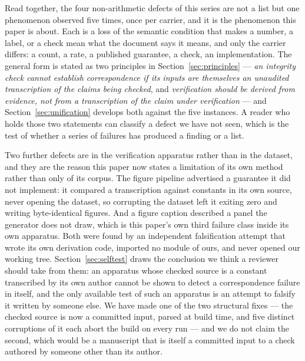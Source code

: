 \documentclass[sigconf,review]{acmart}
\begin{document}
Read together, the four non-arithmetic defects of this series are not a list
but one phenomenon observed five times, once per carrier, and it is the
phenomenon this paper is about. Each is a loss of the semantic condition that makes a number, a
label, or a check mean what the document says it means, and only the carrier
differs: a count, a rate, a published guarantee, a check, an implementation.
The general form is stated as two principles in Section~\ref{sec:principles} ---
\emph{an integrity check cannot establish correspondence if its inputs are
themselves an unaudited transcription of the claims being checked}, and
\emph{verification should be derived from evidence, not from a transcription of
the claim under verification} --- and Section~\ref{sec:unification} develops
both against the five instances. A reader who holds those two statements can
classify a defect we have not seen, which is the test of whether a series of
failures has produced a finding or a list.

Two further defects are in the verification apparatus rather than in the
dataset, and they are the reason this paper now states a limitation of its own
method rather than only of its corpus. The figure pipeline advertised a
guarantee it did not implement: it compared a transcription against constants
in its own source, never opening the dataset, so corrupting the dataset left it
exiting zero and writing byte-identical figures. And a figure caption described
a panel the generator does not draw, which is this paper's own third failure
class inside its own apparatus. Both were found by an independent falsification
attempt that wrote its own derivation code, imported no module of ours, and
never opened our working tree. Section~\ref{sec:selftest} draws the conclusion
we think a reviewer should take from them: an apparatus whose checked source is
a constant transcribed by its own author cannot be shown to detect a
correspondence failure in itself, and the only available test of such an
apparatus is an attempt to falsify it written by someone else. We have made one
of the two structural fixes --- the checked source is now a committed input,
parsed at build time, and five distinct corruptions of it each abort the build
on every run --- and we do not claim the second, which would be a manuscript
that is itself a committed input to a check authored by someone other than its
author.
\end{document}
